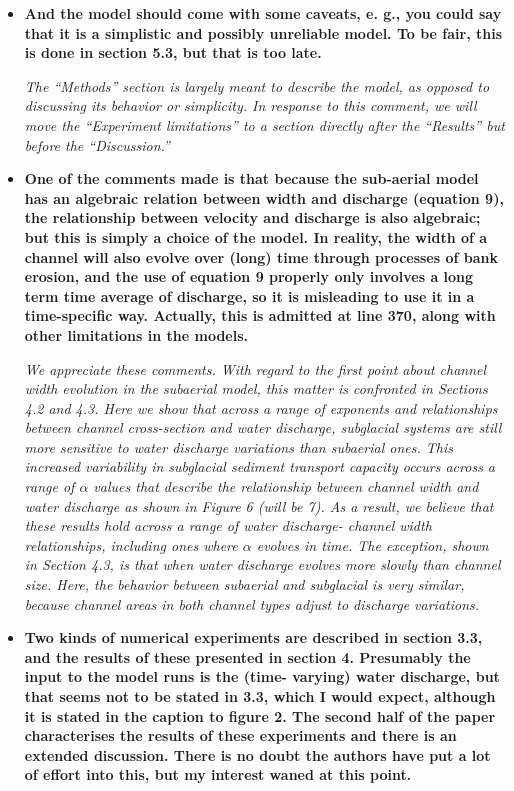 \documentclass[11pt]{article}
\begin{document}
\begin{itemize}
\item  \textbf{And the model should come with some caveats, e. g., you could say that it is a simplistic and possibly unreliable model. To be fair, this is done in section 5.3, but that is too late.}

  \textit{The ``Methods'' section is largely meant to describe the model, as opposed to discussing its behavior or simplicity. In response to this comment, we will move the ``Experiment limitations'' to a section directly after the ``Results'' but before the ``Discussion.''}

  
\item \textbf{  One of the comments made is that because the sub-aerial model has an algebraic relation between width and discharge (equation 9), the relationship between velocity and discharge is also algebraic; but this is simply a choice of the model. In reality, the width of a channel will also evolve over (long) time through processes of bank erosion, and the use of equation 9 properly only involves a long term time average of discharge, so it is misleading to use it in a time-specific way. Actually, this is admitted at line 370, along with other limitations in the models.}


  \textit{We appreciate these comments. With regard to the first point about channel width evolution in the subaerial model, this matter is confronted in Sections 4.2 and 4.3.
    Here we show that across a range of exponents and relationships between channel cross-section and water discharge, subglacial systems are still more sensitive to water discharge variations than subaerial ones.
    This increased variability in subglacial sediment transport capacity occurs across a range of $\alpha$ values that describe the relationship between channel width and water discharge as shown in Figure 6 (will be 7).
    As a result, we believe that these results hold across a range of water discharge- channel width relationships, including ones where $\alpha$ evolves in time.
    The exception, shown in Section 4.3, is that when water discharge evolves more slowly than channel size. Here, the behavior between subaerial and subglacial is very similar, because channel areas in both channel types adjust to discharge variations.}
  

\item   \textbf{Two kinds of numerical experiments are described in section 3.3, and the results of these presented in section 4. Presumably the input to the model runs is the (time- varying) water discharge, but that seems not to be stated in 3.3, which I would expect, although it is stated in the caption to figure 2.
    The second half of the paper characterises the results of these experiments and there is an extended discussion. There is no doubt the authors have put a lot of effort into this, but my interest waned at this point.}
 

\end{itemize}
\end{document}

